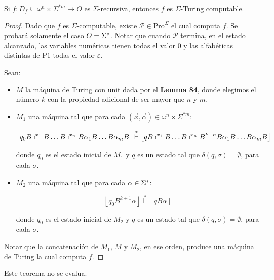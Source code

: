   \pagebreak
	\begin{theorem}
		\PN Si $f: D_{f} \subseteq \omega^{n} \times \Sigma^{\ast m} \rightarrow O$ es $\Sigma$-recursiva, entonces $f$ es
    $\Sigma$-Turing computable.
  \end{theorem}
  \begin{proof}
    \PN Dado que $f$ es $\Sigma$-computable, existe $\mathcal{P} \in \mathrm{Pro}^{\Sigma}$ el cual computa $f$. Se
    probará solamente el caso $O = \Sigma^{\ast}$. Notar que cuando $\mathcal{P}$ termina, en el estado alcanzado, las
    variables numéricas tienen todas el valor $0$ y las alfabéticas distintas de $\mathrm{P}1$ todas el valor
    $\varepsilon$.

    \PN Sean:
    \begin{itemize}
      \item $M$ la máquina de Turing con unit dada por el \textbf{Lemma 84}, donde elegimos el número $k$ con la
        propiedad adicional de ser mayor que $n$ y $m$.

      \item $M_{1}$ una máquina tal que para cada $(\vec{x},\vec{\alpha}) \in \omega^{n} \times \Sigma^{\ast m}$:

      	\[
          \left\lfloor q_{0} B \shortmid^{x_{1}} B \dotsc B \shortmid^{x_{n}} B \alpha_{1} B \dotsc B \alpha_{m} B
          \right\rfloor \overset{\ast}{\vdash}\left\lfloor q B \shortmid^{x_{1}} B \dotsc B \shortmid^{x_{n}}
          B^{k-n} B \alpha_{1} B \dotsc B \alpha_{m} B \right\rfloor
      	\]

        \PN donde $q_{0}$ es el estado inicial de $M_{1}$ y $q$ es un estado tal que $\delta(q,\sigma) =
        \emptyset$, para cada $\sigma$.

      \item $M_{2}$ una máquina tal que para cada $\alpha \in \Sigma^{\ast}$:

      	\[
          \left\lfloor q_{0} B^{k+1} \alpha \right\rfloor \overset{\ast}{\vdash} \left\lfloor q B \alpha
          \right\rfloor
      	\]

        \PN donde $q_{0}$ es el estado inicial de $M_{2}$ y $q$ es un estado tal que $\delta(q,\sigma) =
        \emptyset$, para cada $\sigma$.
    \end{itemize}

    \PN Notar que la concatenación de $M_{1}$, $M$ y $M_{2}$, en ese orden, produce una máquina de Turing la cual
    computa $f$.
	\end{proof}

  \begin{theorem}
    \PN Este teorema no se evalua.
  \end{theorem}
